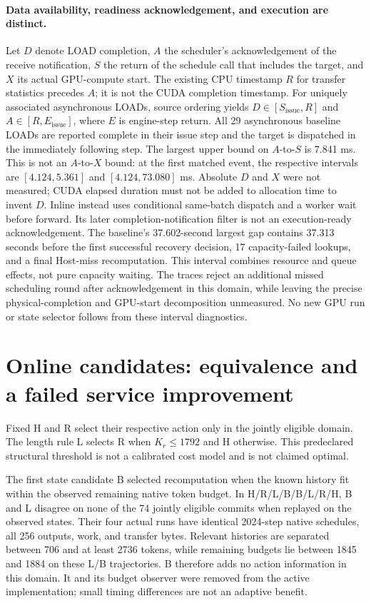 \documentclass[10pt,a4paper]{article}
\begin{document}
\paragraph{Data availability, readiness acknowledgement, and execution are distinct.}
Let $D$ denote LOAD completion, $A$ the scheduler's acknowledgement of the
receive notification, $S$ the return of the schedule call that includes the
target, and $X$ its actual GPU-compute start. The existing CPU timestamp $R$
for transfer statistics precedes $A$; it is not the CUDA completion timestamp.
For uniquely associated asynchronous LOADs, source ordering yields
$D\in[S_{\mathrm{issue}},R]$ and $A\in[R,E_{\mathrm{issue}}]$, where $E$ is
engine-step return. All 29 asynchronous baseline LOADs are reported complete
in their issue step and the target is dispatched in the immediately following
step. The largest upper bound on $A$-to-$S$ is 7.841 ms. This is not an
$A$-to-$X$ bound: at the first matched event, the respective intervals are
$[4.124,5.361]$ and $[4.124,73.080]$ ms. Absolute $D$ and $X$ were not measured;
CUDA elapsed duration must not be added to allocation time to invent $D$.
Inline instead uses conditional same-batch dispatch and a worker wait before
forward. Its later completion-notification filter is not an execution-ready
acknowledgement. The baseline's 37.602-second largest gap contains 37.313
seconds before the first successful recovery decision, 17 capacity-failed
lookups, and a final Host-miss recomputation. This interval combines resource
and queue effects, not pure capacity waiting. The traces reject an additional
missed scheduling round after acknowledgement in this domain, while leaving
the precise physical-completion and GPU-start decomposition unmeasured. No
new GPU run or state selector follows from these interval diagnostics.

\section{Online candidates: equivalence and a failed service improvement}
Fixed H and R select their respective action only in the jointly eligible
domain. The length rule L selects R when $K_r\leq1792$ and H otherwise. This
predeclared structural threshold is not a calibrated cost model and is not
claimed optimal.

The first state candidate B selected recomputation when the known history fit
within the observed remaining native token budget. In H/R/L/B/B/L/R/H, B and
L disagree on none of the 74 jointly eligible commits when replayed on the
observed states. Their four actual runs have identical 2024-step native
schedules, all 256 outputs, work, and transfer bytes. Relevant histories are
separated between 706 and at least 2736 tokens, while remaining budgets lie
between 1845 and 1884 on these L/B trajectories. B therefore adds no action
information in this domain. It and its budget observer were removed from the
active implementation; small timing differences are not an adaptive benefit.
\end{document}
